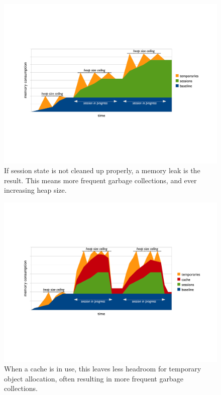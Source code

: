 \begin{figure}
	\centering
	\includegraphics[width=\textwidth]{Figures/lifetime/timeline-base-session-temps-with-leak}
	\caption{If session state is not cleaned up
	properly, a memory leak is the result. This means more frequent garbage
	collections, and ever increasing heap size.}
	\label{fig:timeline-base-session-temps-with-leak}
\end{figure}

\begin{figure}
	\centering
	\includegraphics[width=\textwidth]{Figures/lifetime/timeline-base-session-temps-with-cache}
	\caption{When a cache is in use, this leaves less headroom for temporary
	object allocation, often resulting in more frequent garbage collections.}
	\label{fig:timeline-base-session-temps-with-cache}
\end{figure}

